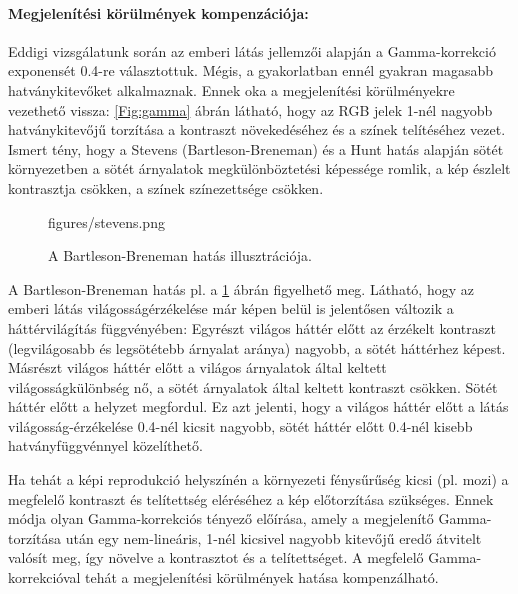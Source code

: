 \paragraph{Megjelenítési körülmények kompenzációja:\\}
Eddigi vizsgálatunk során az emberi látás jellemzői alapján a Gamma-korrekció exponensét 0.4-re választottuk.
Mégis, a gyakorlatban ennél gyakran magasabb hatványkitevőket alkalmaznak.
Ennek oka a megjelenítési körülményekre vezethető vissza: \ref{Fig:gamma} ábrán látható, hogy az RGB jelek 1-nél nagyobb hatványkitevőjű torzítása a kontraszt növekedéséhez és a színek telítéséhez vezet.
Ismert tény, hogy a Stevens (Bartleson-Breneman) és a Hunt hatás alapján sötét környezetben a sötét árnyalatok megkülönböztetési képessége romlik, a kép észlelt kontrasztja csökken, a színek színezettsége csökken.
%
\begin{figure}[]
	\centering
	\begin{overpic}[width = 1\columnwidth ]{figures/stevens.png}
	\end{overpic}
	\caption{A Bartleson-Breneman hatás illusztrációja.}
	\label{Fig:stevens_effect}
\end{figure}
A Bartleson-Breneman hatás pl. a \ref{Fig:stevens_effect} ábrán figyelhető meg.
Látható, hogy az emberi látás világosságérzékelése már képen belül is jelentősen változik a háttérvilágítás függvényében:
Egyrészt világos háttér előtt az érzékelt kontraszt (legvilágosabb és legsötétebb árnyalat aránya) nagyobb, a sötét háttérhez képest.
Másrészt világos háttér előtt a világos árnyalatok által keltett világosságkülönbség nő, a sötét árnyalatok által keltett kontraszt csökken.
Sötét háttér előtt a helyzet megfordul.
Ez azt jelenti, hogy a világos háttér előtt a látás világosság-érzékelése 0.4-nél kicsit nagyobb, sötét háttér előtt 0.4-nél kisebb hatványfüggvénnyel közelíthető.

Ha tehát a képi reprodukció helyszínén a környezeti fénysűrűség kicsi (pl. mozi) a megfelelő kontraszt és telítettség eléréséhez a kép előtorzítása szükséges.
Ennek módja olyan Gamma-korrekciós tényező előírása, amely a megjelenítő Gamma-torzítása után egy nem-lineáris, 1-nél kicsivel nagyobb kitevőjű eredő átvitelt valósít meg, így növelve a kontrasztot és a telítettséget.
A megfelelő Gamma-korrekcióval tehát a megjelenítési körülmények hatása kompenzálható.

